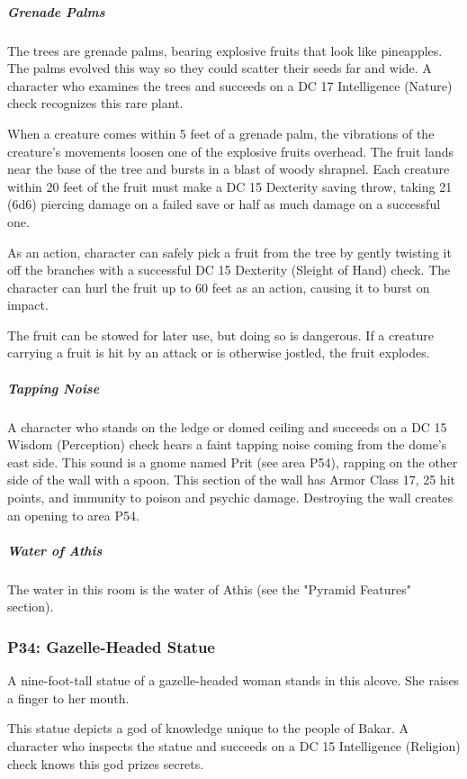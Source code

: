 \documentclass[10pt,a4paper,twoside,bg=print,twocolumn,openany,nodeprecatedcode]{dndbook}
\begin{document}
\subparagraph{Grenade Palms}
The trees are grenade palms, bearing explosive fruits that look like pineapples. The palms evolved this way so they could scatter their seeds far and wide. A character who examines the trees and succeeds on a DC 17 Intelligence (Nature) check recognizes this rare plant.

When a creature comes within 5 feet of a grenade palm, the vibrations of the creature's movements loosen one of the explosive fruits overhead. The fruit lands near the base of the tree and bursts in a blast of woody shrapnel. Each creature within 20 feet of the fruit must make a DC 15 Dexterity saving throw, taking 21 (6d6) piercing damage on a failed save or half as much damage on a successful one.

As an action, character can safely pick a fruit from the tree by gently twisting it off the branches with a successful DC 15 Dexterity (Sleight of Hand) check. The character can hurl the fruit up to 60 feet as an action, causing it to burst on impact.

The fruit can be stowed for later use, but doing so is dangerous. If a creature carrying a fruit is hit by an attack or is otherwise jostled, the fruit explodes.

\subparagraph{Tapping Noise}
A character who stands on the ledge or domed ceiling and succeeds on a DC 15 Wisdom (Perception) check hears a faint tapping noise coming from the dome's east side. This sound is a gnome named Prit (see area P54), rapping on the other side of the wall with a spoon. This section of the wall has Armor Class 17, 25 hit points, and immunity to poison and psychic damage. Destroying the wall creates an opening to area P54.

\subparagraph{Water of Athis}
The water in this room is the water of Athis (see the "Pyramid Features" section).

\subsubsection{P34: Gazelle-Headed Statue}
\begin{DndReadAloud}{}
A nine-foot-tall statue of a gazelle-headed woman stands in this alcove. She raises a finger to her mouth.

\end{DndReadAloud}

This statue depicts a god of knowledge unique to the people of Bakar. A character who inspects the statue and succeeds on a DC 15 Intelligence (Religion) check knows this god prizes secrets.
\end{document}
